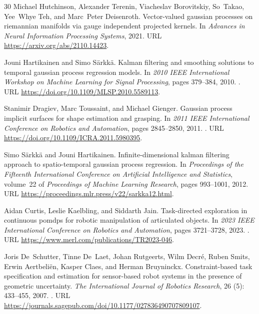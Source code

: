 \documentclass[11pt,a4paper]{article}
\numberwithin{equation}{section}
\theoremstyle{definition}
\begin{document}
\begin{thebibliography}{30}
Michael Hutchinson, Alexander Terenin, Viacheslav Borovitskiy, So~Takao,
  Yee~Whye Teh, and Marc~Peter Deisenroth.
\newblock Vector-valued gaussian processes on riemannian manifolds via gauge
  independent projected kernels.
\newblock In \emph{Advances in Neural Information Processing Systems}, 2021.
\newblock URL \url{https://arxiv.org/abs/2110.14423}.

Jouni Hartikainen and Simo S{\"a}rkk{\"a}.
\newblock Kalman filtering and smoothing solutions to temporal gaussian process
  regression models.
\newblock In \emph{2010 IEEE International Workshop on Machine Learning for
  Signal Processing}, pages 379--384, 2010.
\newblock {}.
\newblock URL \url{https://doi.org/10.1109/MLSP.2010.5589113}.

Stanimir Dragiev, Marc Toussaint, and Michael Gienger.
\newblock Gaussian process implicit surfaces for shape estimation and grasping.
\newblock In \emph{2011 IEEE International Conference on Robotics and
  Automation}, pages 2845--2850, 2011.
\newblock {}.
\newblock URL \url{https://doi.org/10.1109/ICRA.2011.5980395}.

Simo S{\"a}rkk{\"a} and Jouni Hartikainen.
\newblock Infinite-dimensional kalman filtering approach to spatio-temporal
  gaussian process regression.
\newblock In \emph{Proceedings of the Fifteenth International Conference on
  Artificial Intelligence and Statistics}, volume~22 of \emph{Proceedings of
  Machine Learning Research}, pages 993--1001, 2012.
\newblock URL \url{https://proceedings.mlr.press/v22/sarkka12.html}.

Aidan Curtis, Leslie Kaelbling, and Siddarth Jain.
\newblock Task-directed exploration in continuous pomdps for robotic
  manipulation of articulated objects.
\newblock In \emph{2023 IEEE International Conference on Robotics and
  Automation}, pages 3721--3728, 2023.
\newblock {}.
\newblock URL \url{https://www.merl.com/publications/TR2023-046}.

Joris De~Schutter, Tinne De~Laet, Johan Rutgeerts, Wilm Decr{\'e}, Ruben Smits,
  Erwin Aertbeli{\"e}n, Kasper Claes, and Herman Bruyninckx.
\newblock Constraint-based task specification and estimation for sensor-based
  robot systems in the presence of geometric uncertainty.
\newblock \emph{The International Journal of Robotics Research}, 26
  (5): 433--455, 2007.
\newblock {}.
\newblock URL
  \url{https://journals.sagepub.com/doi/10.1177/027836490707809107}.


\end{thebibliography}
\end{document}
